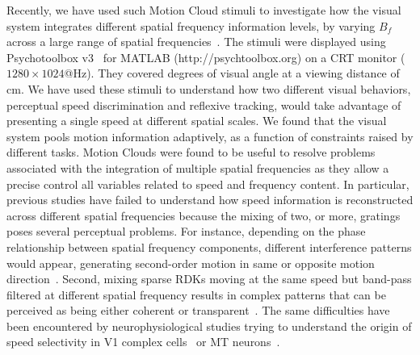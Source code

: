 \documentclass[a4paper,11pt]{article}%
\begin{document}
Recently, we have used such Motion Cloud stimuli to investigate how the visual system integrates different spatial frequency information levels, by varying $B_{f}$ across a large range of spatial frequencies~\citep{Simoncini11}. The stimuli were displayed using Psychotoolbox v3~\citep{Pelli97,Brainard97} for MATLAB (http://psychtoolbox.org) on a CRT monitor ($1280\times1024$@\unit[100]{Hz}). They covered \unit[47]{degrees} of visual angle at a viewing distance of \unit[57]{cm}. We have used these stimuli to understand how two different visual behaviors, perceptual speed discrimination and reflexive tracking, would take advantage of presenting a single speed at different spatial scales. We found that the visual system pools motion information adaptively, as a function of constraints raised by different tasks. Motion Clouds were found to be useful to resolve problems associated with the integration of multiple spatial frequencies as they allow a precise control all variables related to speed and frequency content. In particular, previous studies have failed to understand how speed information is reconstructed across different spatial frequencies because the mixing of two, or more, gratings poses several perceptual problems. For instance, depending on the phase relationship between spatial frequency components, different interference patterns would appear, generating second-order motion in same or opposite motion direction~\citep{smith90}. Second, mixing sparse RDKs moving at the same speed but band-pass filtered at different spatial frequency results in complex patterns that can be perceived as being either coherent or transparent~\citep{watson94}. The same difficulties have been encountered by neurophysiological studies trying to understand the origin of speed selectivity in V1 complex cells~\citep{Priebe06} or MT neurons~\citep{Priebe03}. %
\end{document}
